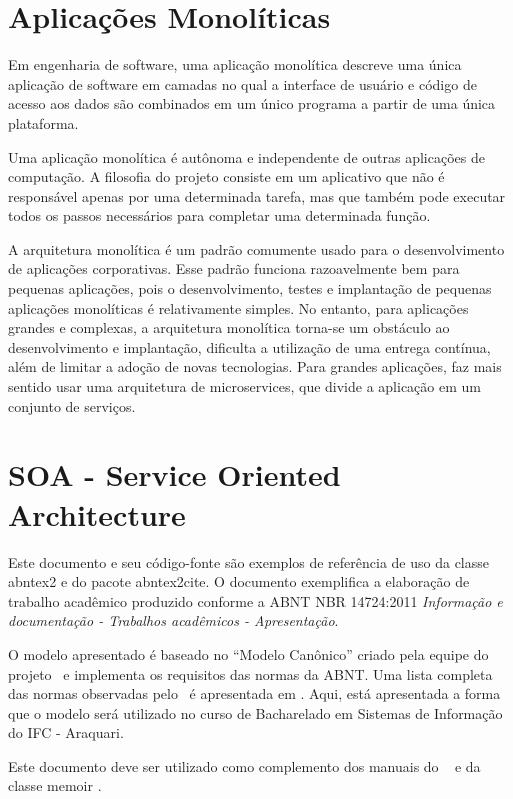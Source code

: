 \section{Aplicações Monolíticas}\label{sec:monolitico}
Em engenharia de software, uma aplicação monolítica descreve uma única aplicação de software em camadas no qual a interface de usuário e código de acesso aos dados são combinados em um único programa a partir de uma única plataforma.

Uma aplicação monolítica é autônoma e independente de outras aplicações de computação. A filosofia do projeto consiste em um aplicativo que não é responsável apenas por uma determinada tarefa, mas que também pode executar todos os passos necessários para completar uma determinada função.

A arquitetura monolítica é um padrão comumente usado para o desenvolvimento de aplicações corporativas. Esse padrão funciona razoavelmente bem para pequenas aplicações, pois o desenvolvimento, testes e implantação de pequenas aplicações monolíticas é relativamente simples. No entanto, para aplicações grandes e complexas, a arquitetura monolítica torna-se um obstáculo ao desenvolvimento e implantação, dificulta a utilização de uma entrega contínua, além de limitar a adoção de novas tecnologias. Para grandes aplicações, faz mais sentido usar uma arquitetura de microservices, que divide a aplicação em um conjunto de serviços.

\section{SOA - Service Oriented Architecture}\label{sec:soa}

Este documento e seu código-fonte são exemplos de referência de uso da classe
\textsf{abntex2} e do pacote \textsf{abntex2cite}. O documento exemplifica a elaboração de trabalho acadêmico produzido conforme a ABNT NBR 14724:2011 \emph{Informação e documentação - Trabalhos acadêmicos - Apresentação}.

O modelo apresentado é baseado no ``Modelo Canônico'' criado pela equipe do projeto \abnTeX\, e implementa os requisitos das normas da ABNT. Uma lista completa das normas
observadas pelo \abnTeX\ é apresentada em . Aqui, está apresentada a forma que o modelo será utilizado no curso de Bacharelado em Sistemas de Informação do IFC - Araquari.

Este documento deve ser utilizado como complemento dos manuais do \abnTeX\ 
\cite{abntex2classe,abntex2cite,abntex2cite-alf} e da classe \textsf{memoir}
\cite{memoir}. 

